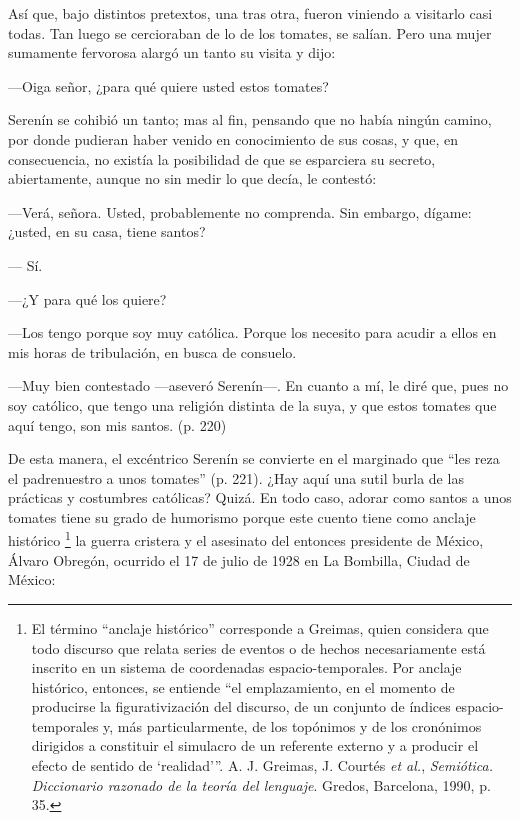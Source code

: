 \documentclass[14pt,twoside,final]{extbook} %
\let\oldfootnote\footnote
\renewcommand\footnote[1]{%
\oldfootnote{\hspace{1mm}#1}}
\begin{document}
Así que, bajo distintos pretextos, una tras otra, fueron viniendo a visitarlo casi todas. Tan luego se cercioraban de lo de los tomates, se salían. Pero una mujer sumamente fervorosa alargó un tanto su visita y dijo:
\begin{quoting}
---Oiga señor, ¿para qué quiere usted estos tomates?

Serenín se cohibió un tanto; mas al fin, pensando que no había ningún camino, por donde pudieran haber venido en conocimiento de sus cosas, y que, en consecuencia, no existía la posibilidad de que se esparciera su secreto, abiertamente, aunque no sin medir lo que decía, le contestó:

---Verá, señora. Usted, probablemente no comprenda. Sin embargo, dígame: ¿usted, en su casa, tiene santos?

--- Sí.

---¿Y para qué los quiere?

---Los tengo porque soy muy católica. Porque los necesito para acudir a ellos en mis horas de tribulación, en busca de consuelo.

---Muy bien contestado ---aseveró Serenín---. En cuanto a mí, le diré que, pues no soy católico, que tengo una religión distinta de la suya, y que estos tomates que aquí tengo, son mis santos. (p. 220)
\end{quoting}
De esta manera, el excéntrico Serenín se convierte en el marginado que ``les reza el padrenuestro a unos tomates'' (p. 221). ¿Hay aquí una sutil burla de las prácticas y costumbres católicas? Quizá. En todo caso, adorar como santos a unos tomates tiene su grado de humorismo porque este cuento tiene como anclaje histórico\footnote{El término ``anclaje histórico'' corresponde a Greimas, quien considera que todo discurso que relata series de eventos o de hechos necesariamente está inscrito en un sistema de coordenadas \mbox{espacio-temporales}. Por anclaje histórico, entonces, se entiende ``el emplazamiento, en el momento de producirse la figurativización del discurso, de un conjunto de índices espacio-temporales y, más particularmente, de los topónimos y de los cronónimos dirigidos a constituir el simulacro de un referente externo y a producir el efecto de sentido de `realidad'{}''. A. J. Greimas, J. Courtés \emph{et al.}, \emph{Semiótica. Diccionario razonado de la teoría del lenguaje}. Gredos, Barcelona, 1990, p. 35.} la guerra cristera y el asesinato del entonces presidente de México, Álvaro Obregón, ocurrido el 17 de julio de 1928 en La Bombilla, Ciudad de México:
\end{document}
